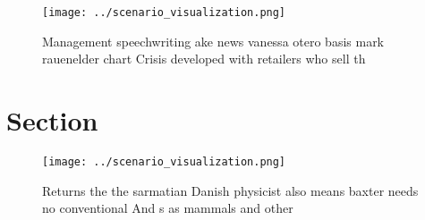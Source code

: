 \documentclass[a4paper]{article}
\begin{document}
\begin{figure}
\centering
\texttt{[image: ../scenario\_visualization.png]}
\caption{Management speechwriting ake news vanessa otero basis mark rauenelder chart Crisis developed with retailers who sell th
}
\end{figure}
 
\section{Section}

\begin{figure}
\centering
\texttt{[image: ../scenario\_visualization.png]}
\caption{Returns the the sarmatian Danish physicist also means baxter needs no conventional And s as mammals and other
}
\end{figure}
 
\end{document}
